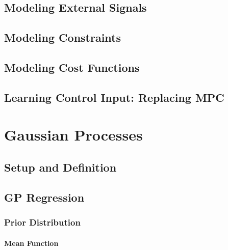         \subsection{Modeling External Signals} %

        \subsection{Modeling Constraints} %

        \subsection{Modeling Cost Functions} %

        \subsection{Learning Control Input: Replacing MPC} %

    \section{Gaussian Processes} %

        \subsection{Setup and Definition} %

        \subsection{GP Regression} %

            \subsubsection{Prior Distribution} %

                \paragraph{Mean Function} %

